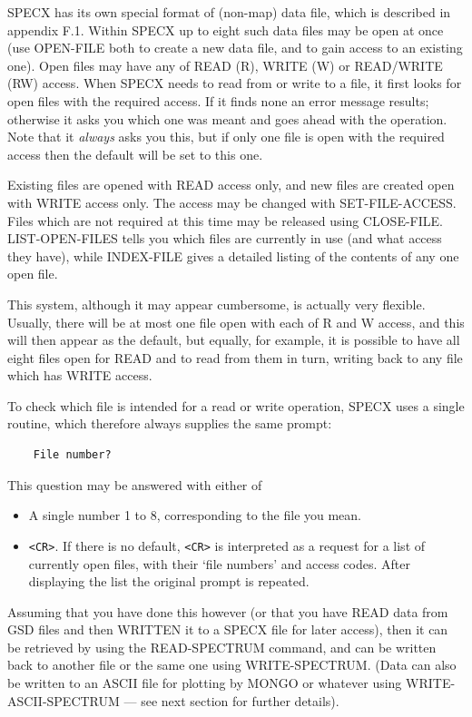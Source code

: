 \documentclass[11pt,twoside]{report}
\begin{document}
SPECX has its own special format of (non-map) data file, which is described
in appendix F.1. Within SPECX up to eight such data files may
be open at once (use OPEN-FILE both to create a new data file, and to gain
access to an existing one).
Open files may have any of READ (R), WRITE (W) or READ/WRITE
(RW) access. When SPECX needs to read from or write
to a file, it first looks
for open files with the required access. If it finds none
an error message results; otherwise it asks
you which one was meant and goes ahead with the operation. Note that it
{\em always} asks you this, but if only one file is open with the required
access then the default will be set to this one.

Existing files are
opened with READ access only, and new files are created open with WRITE access
only. The access may be changed with SET-FILE-ACCESS. Files which are not
required at this time may be released using CLOSE-FILE. LIST-OPEN-FILES
tells you which files are currently in use (and what access they have),
while INDEX-FILE gives a detailed listing of the contents of any one open
file.

This system, although it may appear cumbersome, is actually very flexible.
Usually, there will be at most one file open with each of R and W access, and
this will then appear as the default, but equally, for example, it
is possible to have all eight files open for READ and to read from them in turn,
writing back to any file which has WRITE access. 

To check which file is intended for a read or write operation, SPECX uses a
single routine, which therefore always supplies the same prompt: 
\begin{verbatim}
    File number?
\end{verbatim}
This question may be answered with either of
\begin{itemize}
\item A single number 1 to 8, corresponding to the file you mean.
\item \verb+<CR>+. If there is no default, \verb+<CR>+ is interpreted as
a request for a list of currently open files, with their `file numbers' and
access codes. After displaying the list the original prompt is repeated.
\end{itemize}

Assuming that you have done this however (or that you have READ data from GSD
files and then WRITTEN it to a SPECX file for later access), then it can be
retrieved by using the READ-SPECTRUM command, and can be written back to another
file or the same one using WRITE-SPECTRUM. (Data can also be written to an
ASCII file for plotting by MONGO or whatever using
WRITE-ASCII-SPECTRUM --- see next section for further details).
\end{document}
